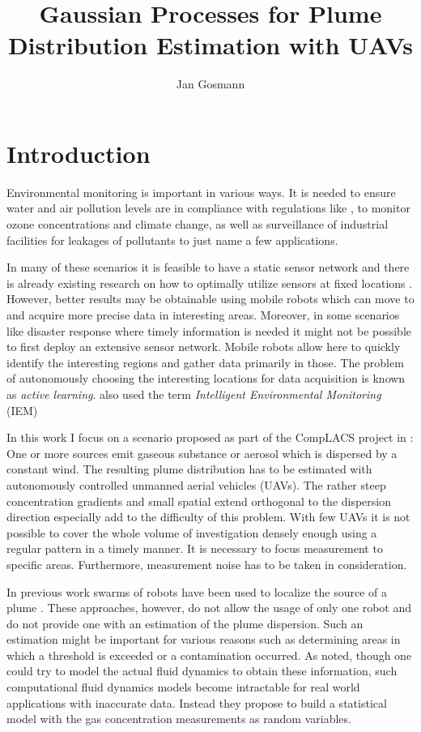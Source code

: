 \documentclass[11pt,a4paper]{scrreprt}
\title{Gaussian Processes for Plume Distribution Estimation with UAVs}
\author{Jan Gosmann}
\newcommand{\newterm}[1]{\emph{#1}}
\begin{document}
\maketitle

\chapter{Introduction}
Environmental monitoring is important in various ways. It is needed to ensure 
water and air pollution levels are in compliance with regulations like 
\textcite{Anonymous:1996ui}, to monitor ozone concentrations and climate change,  
as well as surveillance of industrial facilities for leakages of pollutants to 
just name a few applications.

In many of these scenarios it is feasible to have a static sensor network and 
there is already existing research on how to optimally utilize sensors at fixed 
locations \parencite[e.g.][]{Osborne:2008hi, Guestrin:2005cq, Wang:kz}.  
However, better results may be obtainable using mobile robots which can move to 
and acquire more precise data in interesting areas. Moreover, in some scenarios 
like disaster response where timely information is needed it might not be 
possible to first deploy an extensive sensor network. Mobile robots allow here 
to quickly identify the interesting regions and gather data primarily in those.  
The problem of autonomously choosing the interesting locations for data 
acquisition is known as \newterm{active learning}. \textcite{Marchant:2012wb} 
also used the term \newterm{Intelligent Environmental Monitoring} (IEM) 

In this work I focus on a scenario proposed as part of the CompLACS project in 
\textcite{denardi2013rn}: One or more sources emit gaseous substance or aerosol 
which is dispersed by a constant wind. The resulting plume distribution has to 
be estimated with autonomously controlled unmanned aerial vehicles (UAVs). The 
rather steep concentration gradients and small spatial extend orthogonal to the 
dispersion direction especially add to the difficulty of this problem.  With few 
UAVs it is not possible to cover the whole volume of investigation densely 
enough using a regular pattern in a timely manner. It is necessary to focus 
measurement to specific areas. Furthermore, measurement noise has to be taken in 
consideration.

In previous work swarms of robots have been used to localize the source of 
a plume \parencite{Jatmiko:2007df, Zarzhitsky:2005tz}. These approaches, 
however, do not allow the usage of only one robot and do not provide one with an 
estimation of the plume dispersion. Such an estimation might be important for 
various reasons such as determining areas in which a threshold is exceeded or 
a contamination occurred. As \textcite{Reggente:2009ti} noted, though one could 
try to model the actual fluid dynamics to obtain these information, such 
computational fluid dynamics models become intractable for real world 
applications with inaccurate data.  Instead they propose to build a statistical 
model with the gas concentration measurements as random variables.
\end{document}
